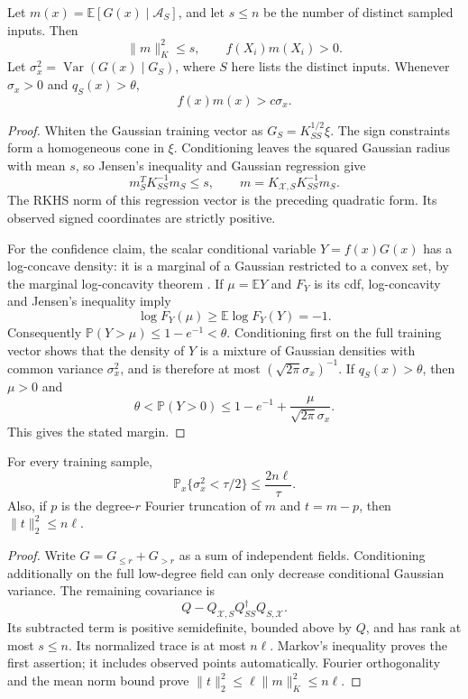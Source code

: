 \begin{lemma}\label{lem:schedule-mean}
Let $m(x)=\mathbb E[G(x)\mid\mathcal A_S]$, and let $s\le n$ be the
number of distinct sampled inputs. Then
\[
 \|m\|_K^2\le s,\qquad f(X_i)m(X_i)>0.
\]
Let $\sigma_x^2=\operatorname{Var}(G(x)\mid G_S)$, where $S$ here lists
the distinct inputs. Whenever $\sigma_x>0$ and $q_S(x)>\theta$,
\[
 f(x)m(x)>c\sigma_x.
\]
\end{lemma}
\begin{proof}
Whiten the Gaussian training vector as $G_S=K_{SS}^{1/2}\xi$.
The sign constraints form a homogeneous cone in $\xi$. Conditioning
leaves the squared Gaussian radius with mean $s$, so Jensen's inequality
and Gaussian regression give
\[
 m_S^TK_{SS}^{-1}m_S\le s,\qquad
 m=K_{\mathcal X,S}K_{SS}^{-1}m_S.
\]
The RKHS norm of this regression vector is the preceding quadratic
form. Its observed signed coordinates are strictly positive.

For the confidence claim, the scalar conditional variable
$Y=f(x)G(x)$ has a log-concave density: it is a marginal of a Gaussian
restricted to a convex set, by the marginal log-concavity theorem \cite{prekopa1973}. If $\mu=\mathbb E Y$ and $F_Y$ is its
cdf, log-concavity and Jensen's inequality imply
\[
 \log F_Y(\mu)\ge\mathbb E\log F_Y(Y)=-1.
\]
Consequently $\mathbb P(Y>\mu)\le1-e^{-1}<\theta$.
Conditioning first on the full training vector shows that the density
of $Y$ is a mixture of Gaussian densities with common variance
$\sigma_x^2$, and is therefore at most
$(\sqrt{2\pi}\sigma_x)^{-1}$. If $q_S(x)>\theta$, then $\mu>0$ and
\[
 \theta<\mathbb P(Y>0)
 \le 1-e^{-1}+\frac{\mu}{\sqrt{2\pi}\sigma_x}.
\]
This gives the stated margin.
\end{proof}

\begin{lemma}\label{lem:schedule-var}
For every training sample,
\[
 \mathbb P_x\{\sigma_x^2<\tau/2\}\le \frac{2n\ell}{\tau}.
\]
Also, if $p$ is the degree-$r$ Fourier truncation of $m$ and $t=m-p$,
then $\|t\|_2^2\le n\ell$.
\end{lemma}
\begin{proof}
Write $G=G_{\le r}+G_{>r}$ as a sum of independent fields. Conditioning
additionally on the full low-degree field can only decrease conditional
Gaussian variance. The remaining covariance is
\[
 Q-Q_{\mathcal X,S}Q_{SS}^{\dagger}Q_{S,\mathcal X}.
\]
Its subtracted term is positive semidefinite, bounded above by $Q$,
and has rank at most $s\le n$. Its normalized trace is at most $n\ell$.
Markov's inequality proves the first assertion; it includes observed
points automatically. Fourier orthogonality and the mean norm bound
prove $\|t\|_2^2\le\ell\|m\|_K^2\le n\ell$.
\end{proof}

